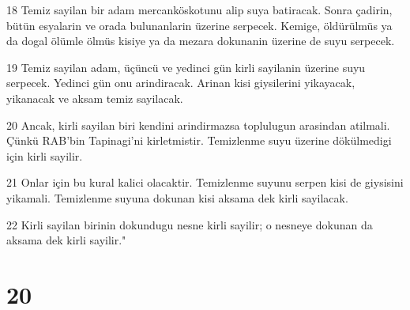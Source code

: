 \par 18 Temiz sayilan bir adam mercanköskotunu alip suya batiracak. Sonra çadirin, bütün esyalarin ve orada bulunanlarin üzerine serpecek. Kemige, öldürülmüs ya da dogal ölümle ölmüs kisiye ya da mezara dokunanin üzerine de suyu serpecek.
\par 19 Temiz sayilan adam, üçüncü ve yedinci gün kirli sayilanin üzerine suyu serpecek. Yedinci gün onu arindiracak. Arinan kisi giysilerini yikayacak, yikanacak ve aksam temiz sayilacak.
\par 20 Ancak, kirli sayilan biri kendini arindirmazsa toplulugun arasindan atilmali. Çünkü RAB'bin Tapinagi'ni kirletmistir. Temizlenme suyu üzerine dökülmedigi için kirli sayilir.
\par 21 Onlar için bu kural kalici olacaktir. Temizlenme suyunu serpen kisi de giysisini yikamali. Temizlenme suyuna dokunan kisi aksama dek kirli sayilacak.
\par 22 Kirli sayilan birinin dokundugu nesne kirli sayilir; o nesneye dokunan da aksama dek kirli sayilir."

\chapter{20}

